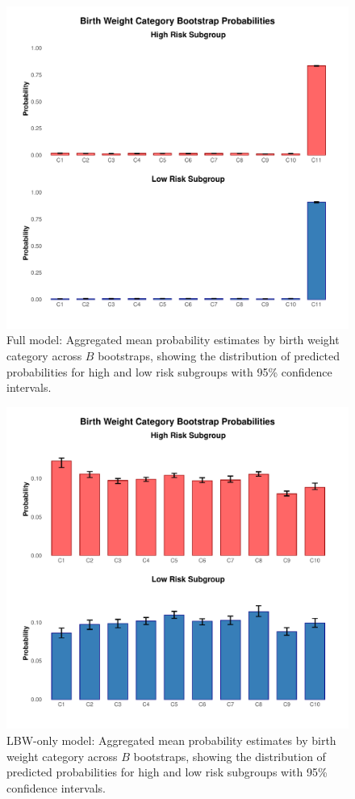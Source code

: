 \begin{figure}[H]
    \centering
    \includegraphics[width=1\textwidth]{chapters/chapter3/figures/high_low_risk_full.pdf}
    \caption{Full model: Aggregated mean probability estimates by birth weight category across $B$ bootstraps, showing the distribution of predicted probabilities for high and low risk subgroups with 95\% confidence intervals.}
    \label{fig:high-low-risk-full}
\end{figure}

\begin{figure}[H]
    \centering
    \includegraphics[width=1\textwidth]{chapters/chapter3/figures/high_low_risk_small.pdf}
    \caption{LBW-only model: Aggregated mean probability estimates by birth weight category across $B$ bootstraps, showing the distribution of predicted probabilities for high and low risk subgroups with 95\% confidence intervals.}
    \label{fig:high-low-risk-lbw}
\end{figure}



